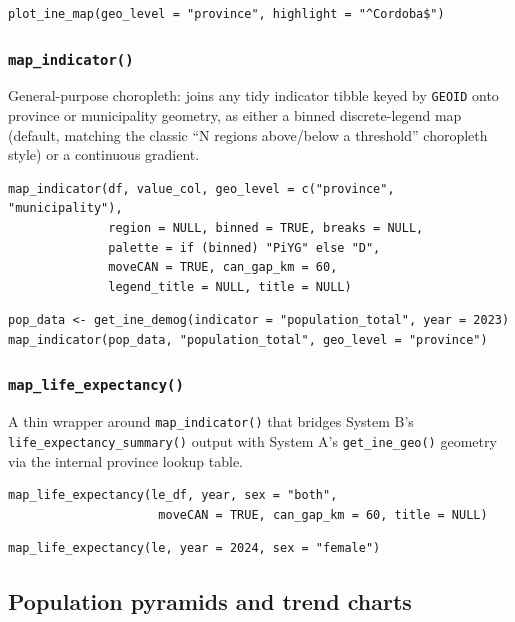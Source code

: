 \documentclass[11pt]{article}
\newcommand{\fn}[1]{\texttt{#1}}
\begin{document}
\begin{lstlisting}
plot_ine_map(geo_level = "province", highlight = "^Cordoba$")
\end{lstlisting}

\subsubsection{\fn{map\_indicator()}}

General-purpose choropleth: joins any tidy indicator tibble keyed by
\fn{GEOID} onto province or municipality geometry, as either a binned
discrete-legend map (default, matching the classic ``N regions
above/below a threshold'' choropleth style) or a continuous gradient.

\begin{lstlisting}
map_indicator(df, value_col, geo_level = c("province", "municipality"),
              region = NULL, binned = TRUE, breaks = NULL,
              palette = if (binned) "PiYG" else "D",
              moveCAN = TRUE, can_gap_km = 60,
              legend_title = NULL, title = NULL)
\end{lstlisting}

\begin{lstlisting}
pop_data <- get_ine_demog(indicator = "population_total", year = 2023)
map_indicator(pop_data, "population_total", geo_level = "province")
\end{lstlisting}

\subsubsection{\fn{map\_life\_expectancy()}}

A thin wrapper around \fn{map\_indicator()} that bridges System B's
\fn{life\_expectancy\_summary()} output with System A's
\fn{get\_ine\_geo()} geometry via the internal province lookup table.

\begin{lstlisting}
map_life_expectancy(le_df, year, sex = "both",
                     moveCAN = TRUE, can_gap_km = 60, title = NULL)
\end{lstlisting}

\begin{lstlisting}
map_life_expectancy(le, year = 2024, sex = "female")
\end{lstlisting}

\subsection{Population pyramids and trend charts}
\end{document}
